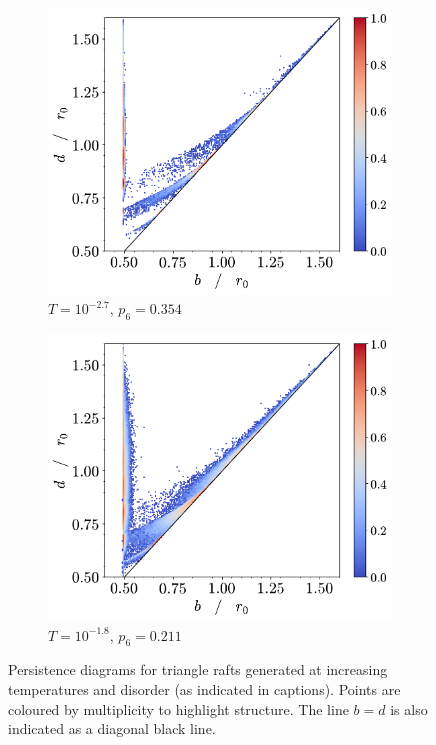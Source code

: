 \begin{figure}[tb]
     \vspace{2mm}
     \begin{subfigure}[b]{0.48\textwidth}
         \centering
         \includegraphics[width=\textwidth]{./figures/ph/t-2700_tr_pd.pdf}
         \caption{$T=10^{-2.7}$, $p_6=0.354$}
         \label{fig:trpdc}
     \end{subfigure}
     \hfill
      \begin{subfigure}[b]{0.48\textwidth}
         \centering
         \includegraphics[width=\textwidth]{./figures/ph/t-1800_tr_pd.pdf}
         \caption{$T=10^{-1.8}$, $p_6=0.211$}
         \label{fig:trpdd}
     \end{subfigure}
     \hfill
    
	\caption{Persistence diagrams for triangle rafts generated at increasing temperatures and disorder (as indicated in captions). Points are coloured by multiplicity to highlight structure. The line $b=d$ is also indicated as a diagonal black line.}
	\label{fig:trpd}
\end{figure}

